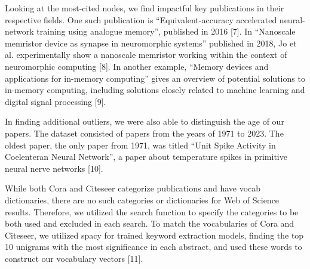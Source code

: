 \documentclass[conference]{IEEEtran}
\begin{document}
Looking at the most-cited nodes, we find impactful key publications 
in their respective fields. One such publication is “Equivalent-accuracy 
accelerated neural-network training using analogue memory”, published in 2016 [7]. 
In “Nanoscale memristor device as synapse in neuromorphic systems'' published 
in 2018,  Jo et al. experimentally show a nanoscale memristor working within 
the context of neuromorphic computing [8]. In another example, “Memory devices 
and applications for in-memory computing” gives an overview of potential solutions 
to in-memory computing, including solutions closely related to machine learning and 
digital signal processing [9]. \par

In finding additional outliers, we were also able to distinguish the age of our papers. 
The dataset consisted of papers from the years of 1971 to 2023. The oldest paper, 
the only paper from 1971, was titled “Unit Spike Activity in Coelenteran Neural Network”, 
a paper about temperature spikes in primitive neural nerve networks [10].  \par

While both Cora and Citeseer categorize publications and have vocab dictionaries, 
there are no such categories or dictionaries for Web of Science results. 
Therefore, we utilized the search function to specify the categories to be 
both used and excluded in each search. To match the vocabularies of Cora and 
Citeseer, we utilized spacy for trained keyword extraction models, finding 
the top 10 unigrams with the most significance in each abstract, and used 
these words to construct our vocabulary vectors [11]. \par
\end{document}
